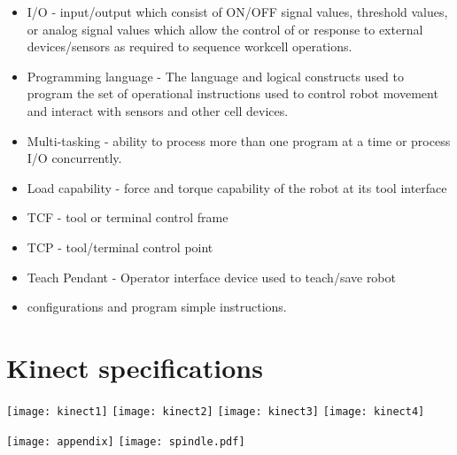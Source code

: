 \begin{itemize}
\item I/O - input/output which consist of ON/OFF signal values, threshold values, or analog signal values which allow the control of or response to external devices/sensors as required to sequence workcell operations.
\item Programming language - The language and logical constructs used to program the set of operational instructions used to control robot movement and interact with sensors and other cell devices.
\item Multi-tasking - ability to process more than one program at a time or process I/O concurrently.
\item Load capability - force and torque capability of the robot at its tool interface
\item TCF - tool or terminal control frame
\item TCP - tool/terminal control point
\item Teach Pendant - Operator interface device used to teach/save robot \item configurations and program simple instructions.
\end{itemize}


\newpage
\section{Kinect specifications}
\begin{center}
\texttt{[image: kinect1]}	
\texttt{[image: kinect2]}
\texttt{[image: kinect3]}
\texttt{[image: kinect4]}
\end{center}

\newpage
\texttt{[image: appendix]}
\newpage
\texttt{[image: spindle.pdf]}

